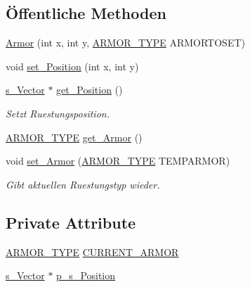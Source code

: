 \subsection*{Öffentliche Methoden}
\begin{DoxyCompactItemize}
\item 
\hyperlink{class_armor_ab9f3edb9b0fe736b82056fbfd6abe467}{Armor} (int x, int y, \hyperlink{globals_8h_a8e5f74edbc14259a161d93bd9a69d236}{A\-R\-M\-O\-R\-\_\-\-T\-Y\-P\-E} A\-R\-M\-O\-R\-T\-O\-S\-E\-T)
\item 
void \hyperlink{class_armor_a007fd5929f7cd4c3ab062094c2465371}{set\-\_\-\-Position} (int x, int y)
\item 
\hyperlink{structs___vector}{s\-\_\-\-Vector} $\ast$ \hyperlink{class_armor_aafd49a78e1d9de2ec03bdef3c5b7f454}{get\-\_\-\-Position} ()
\begin{DoxyCompactList}\small\item\em Setzt Ruestungsposition. \end{DoxyCompactList}\item 
\hyperlink{globals_8h_a8e5f74edbc14259a161d93bd9a69d236}{A\-R\-M\-O\-R\-\_\-\-T\-Y\-P\-E} \hyperlink{class_armor_a77760241405973937918be3377b2a02d}{get\-\_\-\-Armor} ()
\item 
void \hyperlink{class_armor_a8c1238b98e8bc91fb39e0e7ef8a331bf}{set\-\_\-\-Armor} (\hyperlink{globals_8h_a8e5f74edbc14259a161d93bd9a69d236}{A\-R\-M\-O\-R\-\_\-\-T\-Y\-P\-E} T\-E\-M\-P\-A\-R\-M\-O\-R)
\begin{DoxyCompactList}\small\item\em Gibt aktuellen Ruestungstyp wieder. \end{DoxyCompactList}\end{DoxyCompactItemize}
\subsection*{Private Attribute}
\begin{DoxyCompactItemize}
\item 
\hyperlink{globals_8h_a8e5f74edbc14259a161d93bd9a69d236}{A\-R\-M\-O\-R\-\_\-\-T\-Y\-P\-E} \hyperlink{class_armor_a41b1d44de440d9bbbcd4c4b8f7757f53}{C\-U\-R\-R\-E\-N\-T\-\_\-\-A\-R\-M\-O\-R}
\item 
\hyperlink{structs___vector}{s\-\_\-\-Vector} $\ast$ \hyperlink{class_armor_a176b9bdfec3dcc70738547f7b8659912}{p\-\_\-s\-\_\-\-Position}
\end{DoxyCompactItemize}


